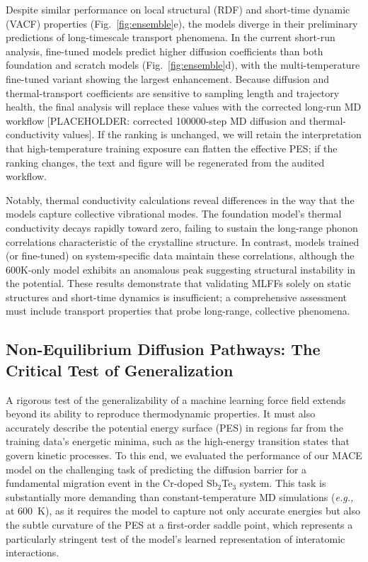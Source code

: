 \documentclass[pdflatex,sn-mathphys-num]{sn-jnl}%
\providecommand{\reviewermap}[3]{}
\theoremstyle{thmstyleone}%
\theoremstyle{thmstyletwo}%
\theoremstyle{thmstylethree}%
\begin{document}
\reviewermap{REV-C9}{pending-cluster}{Long-run MD transport values must be replaced by the corrected 100000-step workflow before final submission.}
Despite similar performance on local structural (RDF) and short-time dynamic (VACF) properties (Fig.~\ref{fig:ensemble}e), the models diverge in their preliminary predictions of long-timescale transport phenomena. In the current short-run analysis, fine-tuned models predict higher diffusion coefficients than both foundation and scratch models (Fig.~\ref{fig:ensemble}d), with the multi-temperature fine-tuned variant showing the largest enhancement. Because diffusion and thermal-transport coefficients are sensitive to sampling length and trajectory health, the final analysis will replace these values with the corrected long-run MD workflow [PLACEHOLDER: corrected 100000-step MD diffusion and thermal-conductivity values]. If the ranking is unchanged, we will retain the interpretation that high-temperature training exposure can flatten the effective PES; if the ranking changes, the text and figure will be regenerated from the audited workflow.

Notably, thermal conductivity calculations reveal differences in the way that the  models capture collective vibrational modes. The foundation model's thermal conductivity decays rapidly toward zero, failing to sustain the long-range phonon correlations characteristic of the crystalline structure. In contrast, models trained (or fine-tuned) on system-specific data maintain these correlations, although the 600K-only model exhibits an anomalous peak suggesting structural instability in the potential. These results demonstrate that validating MLFFs solely on static structures and short-time dynamics is insufficient; a comprehensive assessment must include transport properties that probe long-range, collective phenomena.




\subsection{Non-Equilibrium Diffusion Pathways: The Critical Test of Generalization}

A rigorous test of the generalizability of a machine learning force field extends beyond its ability to reproduce thermodynamic properties. It must also accurately describe the potential energy surface (PES) in regions far from the training data's energetic minima, such as the high-energy transition states that govern kinetic processes. To this end, we evaluated the performance of our MACE model on the challenging task of predicting the diffusion barrier for a fundamental migration event in the Cr-doped Sb$_2$Te$_3$ system. This task is substantially more demanding than constant-temperature MD simulations (\textit{e.g.,} at 600~K), as it requires the model to capture not only accurate energies but also the subtle curvature of the PES at a first-order saddle point, which represents a particularly stringent test of the model's learned representation of interatomic interactions.
\end{document}
